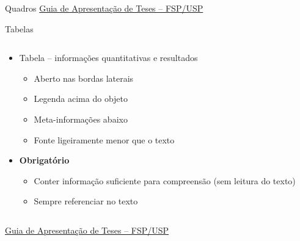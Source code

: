 \documentclass{beamer}
\begin{document}
\begin{frame}{Quadros}
  \vfill
  \scriptsize
  \hfill \href{http://www.biblioteca.fsp.usp.br/~biblioteca/guia/i_cap_04.htm}
  {Guia de Apresentação de Teses -- FSP/USP}
\end{frame}

\begin{frame}{Tabelas}
  \begin{columns}
    \begin{column}{.5\textwidth}
  \begin{itemize}
    \scriptsize
  \item Tabela -- informações quantitativas e resultados
    \begin{itemize}
      \tiny
    \item Aberto nas bordas laterais
    \item Legenda acima do objeto
    \item Meta-informações abaixo
    \item Fonte ligeiramente menor que o texto
    \end{itemize}
    \bigskip
  \item \alert{\bf Obrigatório}
    \begin{itemize}
      \tiny
    \item Conter informação suficiente para compreensão ({\tiny sem leitura do texto})
    \item Sempre referenciar no texto
    \end{itemize}
  \end{itemize}
    \end{column}
    \begin{column}{.5\textwidth}
    \end{column}
  \end{columns}

  \vfill
  \scriptsize
  \hfill \href{http://www.biblioteca.fsp.usp.br/~biblioteca/guia/i_cap_04.htm}
  {Guia de Apresentação de Teses -- FSP/USP}
\end{frame}
\end{document}
